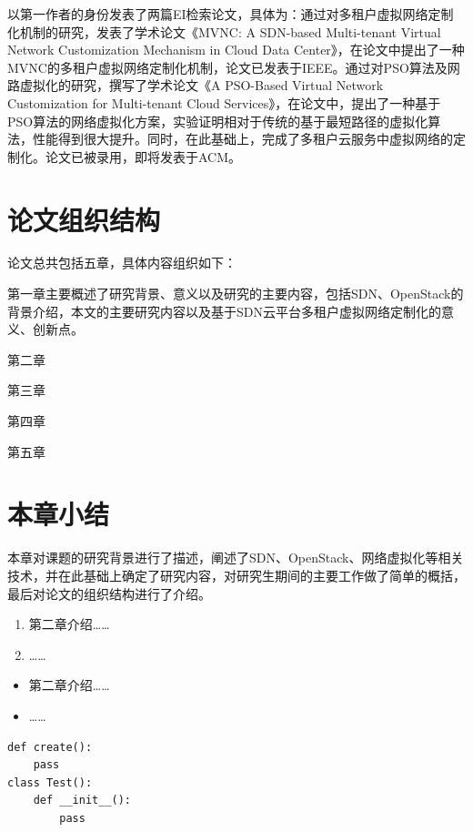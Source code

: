 以第一作者的身份发表了两篇EI检索论文，具体为：通过对多租户虚拟网络定制化机制的研究，发表了学术论文《MVNC: A SDN-based Multi-tenant Virtual Network Customization Mechanism in Cloud Data Center》，在论文中提出了一种MVNC的多租户虚拟网络定制化机制，论文已发表于IEEE。通过对\gls*{PSO}算法及网路虚拟化的研究，撰写了学术论文《A PSO-Based Virtual Network Customization for Multi-tenant Cloud Services》，在论文中，提出了一种基于PSO算法的网络虚拟化方案，实验证明相对于传统的基于最短路径的虚拟化算法，性能得到很大提升。同时，在此基础上，完成了多租户云服务中虚拟网络的定制化。论文已被录用，即将发表于ACM。
\section{论文组织结构}
论文总共包括五章，具体内容组织如下：

第一章主要概述了研究背景、意义以及研究的主要内容，包括SDN、OpenStack的背景介绍，本文的主要研究内容以及基于SDN云平台多租户虚拟网络定制化的意义、创新点。

第二章

第三章

第四章

第五章

\section{本章小结}
本章对课题的研究背景进行了描述，阐述了SDN、OpenStack、网络虚拟化等相关技术，并在此基础上确定了研究内容，对研究生期间的主要工作做了简单的概括，最后对论文的组织结构进行了介绍。

\begin{enumerate}
\item 第二章介绍……
\item ……
\end{enumerate}
\begin{itemize}
\item 第二章介绍……
\item ……
\end{itemize}

\begin{center}
\begin{verbatim} 
def create():
    pass
class Test():
    def __init__():
        pass
\end{verbatim}  
\end{center}

